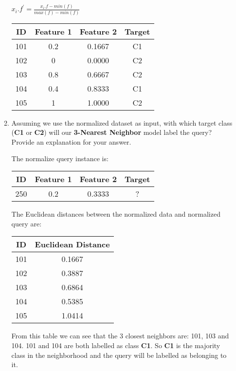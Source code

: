 \documentclass[nosolution]{ditpaper}
\begin{document}
\begin{enumerate}
\begin{enumerate}
								\begin{center}
								$x_i.f^\prime=\frac{x_i.f - min(f)}{max(f)-min(f)}$
								\end{center}		
				\begin{answer}
					\begin{center}
\begin{tabular}{cccc}
\hline
ID & Feature 1 & Feature 2  & Target \\
\hline
101 &	0.2 &	 0.1667 &	C1\\
102 &	0    & 	0.0000 &	C2\\
103 &	0.8 & 	0.6667 &	C2\\
104 &	0.4 &	   0.8333 &	C1\\
105 &	1    & 	1.0000 &	C2\\
\hline
\end{tabular}
					\end{center}
				\end{answer}
			\item Assuming we use the normalized dataset as input, with which target class (\textbf{C1}  or \textbf{C2}) will our \textbf{3-Nearest Neighbor} model label the query? Provide an explanation for your answer.				
				\begin{answer}
					The normalize query instance is:
\begin{center}
\begin{tabular}{|c|c|c|c|}
\hline
ID & Feature 1 & Feature 
2  & Target \\
\hline
250 & 0.2 & 0.3333 & ?\\
\hline
\end{tabular}
\end{center}
				The Euclidean distances between the normalized data and normalized query are: 
					\begin{center}
						\begin{tabular}{|c|c|}
						ID & Euclidean Distance \\
						\hline
101	& 0.1667\\
102	& 0.3887\\
103	& 0.6864\\
104	& 0.5385\\
105	&1.0414\\						
\hline
						\end{tabular}
					\end{center}
From this table we can see that the 3 closest neighbors are: 101, 103 and 104. 101 and 104 are both labelled as class \textbf{C1}. So \textbf{C1} is the majority class in the neighborhood and the query will be labelled as belonging to it.					
				\end{answer}	
		\end{enumerate}
		

\end{enumerate}
\end{document}
